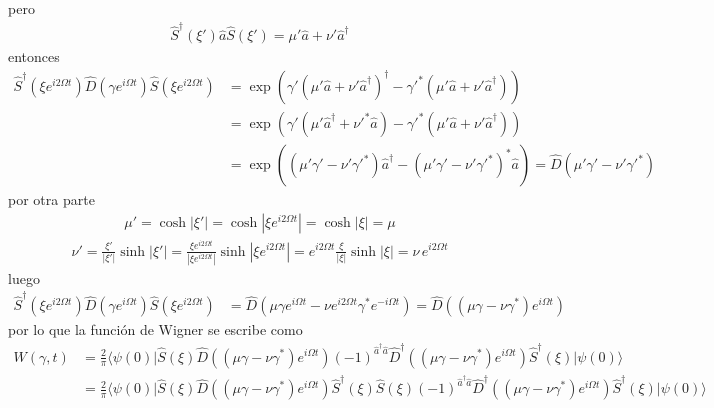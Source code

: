 pero
\begin{align*}
	\hat{S}^{\dagger}(\xi')\hat{a}\hat{S}(\xi') = \mu' \hat{a} + \nu' \hat{a}^{\dagger}
\end{align*}
entonces
\begin{align*}
	\hat{S}^{\dagger}\left(\xi e^{i2\Omega t}\right)\hat{D}\left(\gamma e^{i\Omega t}\right) \hat{S}(\xi e^{i 2\Omega t})
	 & = \exp\left(\gamma' \left(\mu' \hat{a}+\nu'\hat{a}^{\dagger}\right)^{\dagger}-\gamma'^{*}\left(\mu' \hat{a}+\nu'\hat{a}^{\dagger}\right)\right) \\
	 & = \exp\left(\gamma' \left(\mu' \hat{a}^{\dagger}+\nu'^{*}\hat{a}\right)-\gamma'^{*}\left(\mu' \hat{a}+\nu'\hat{a}^{\dagger}\right)\right)       \\
	 & = \exp\left(\left(\mu'\gamma'-\nu'\gamma'^{*} \right)\hat{a}^{\dagger}-\left(\mu'\gamma'-\nu'\gamma'^{*} \right)^{*}\hat{a}\right)
	= \hat{D}\left(\mu'\gamma'-\nu'\gamma'^{*}\right)
\end{align*}
por otra parte
\begin{align*}
	\mu' = \cosh\vert\xi'\vert = \cosh\left\vert \xi e^{i 2\Omega t}\right\vert = \cosh\left\vert \xi\right\vert = \mu
\end{align*}
\begin{align*}
	\nu' = \frac{\xi'}{\vert\xi'\vert}\sinh\left\vert \xi'\right\vert = \frac{\xi e^{i2\Omega t}}{\left\vert\xi e^{i2\Omega t}\right\vert} \sinh\left\vert \xi e^{i2\Omega t} \right\vert = e^{i2\Omega t} \frac{\xi}{\left\vert\xi \right\vert} \sinh\left\vert \xi  \right\vert = \nu \, e^{i2\Omega t}
\end{align*}
luego
\begin{align*}
	\hat{S}^{\dagger}\left(\xi e^{i2\Omega t}\right)\hat{D}\left(\gamma e^{i\Omega t}\right) \hat{S}(\xi e^{i 2\Omega t})
	 & = \hat{D}\left(\mu \gamma e^{i\Omega t} - \nu e^{i2\Omega t} \gamma^{*}e^{-i\Omega t}\right) = \hat{D}\left(\left(\mu\gamma - \nu\gamma^{*}\right)e^{i\Omega t}\right)
\end{align*}
por lo que la funci\'on de Wigner se escribe como
\begin{align*}
	W(\gamma,t) & = \frac{2}{\pi} \langle \psi(0)\vert \hat{S}(\xi)\hat{D}\left(\left(\mu\gamma-\nu\gamma^{*}\right)e^{i\Omega t}\right) (-1)^{\hat{a}^{\dagger}\hat{a}} \hat{D}^{\dagger}\left(\left(\mu\gamma-\nu\gamma^{*}\right)e^{i\Omega t}\right)\hat{S}^{\dagger}(\xi) \vert \psi(0)\rangle
	\\
	            & = \frac{2}{\pi} \langle \psi(0)\vert \hat{S}(\xi)\hat{D}\left(\left(\mu\gamma-\nu\gamma^{*}\right)e^{i\Omega t}\right) \hat{S}^{\dagger}(\xi)\hat{S}(\xi)(-1)^{\hat{a}^{\dagger}\hat{a}} \hat{D}^{\dagger}\left(\left(\mu\gamma-\nu\gamma^{*}\right)e^{i\Omega t}\right)\hat{S}^{\dagger}(\xi) \vert \psi(0)\rangle
\end{align*}
